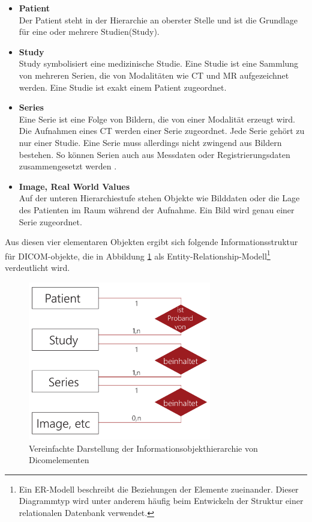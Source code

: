 \begin{itemize}
	\item \textbf{Patient}\\
	Der Patient steht in der Hierarchie an oberster Stelle und ist die Grundlage für eine oder mehrere Studien(Study).
	\item	\textbf{Study}\\
	Study symbolisiert eine medizinische Studie. Eine Studie ist eine Sammlung von mehreren Serien, die von Modalitäten wie CT und MR aufgezeichnet werden. Eine Studie ist exakt einem Patient zugeordnet.
	\item \textbf{Series}\\
	Eine Serie ist eine Folge von Bildern, die von einer Modalität erzeugt wird. Die Aufnahmen eines CT werden einer Serie zugeordnet. Jede Serie gehört zu nur einer Studie. Eine Serie muss allerdings nicht zwingend aus Bildern bestehen. So können Serien auch aus Messdaten oder Registrierungsdaten zusammengesetzt werden \cite[A.1.2]{dicom:iod}.
	\item \textbf{Image, Real World Values}\\
	Auf der unteren Hierarchiestufe stehen Objekte wie Bilddaten oder die Lage des Patienten im Raum während der Aufnahme. Ein Bild wird genau einer Serie zugeordnet.
\end{itemize}

Aus diesen vier elementaren Objekten ergibt sich folgende Informationsstruktur für DICOM-objekte, die in Abbildung \ref{ermodel} als Entity-Relationship-Modell\footnote{Ein ER-Modell beschreibt die Beziehungen der Elemente zueinander. Dieser Diagrammtyp wird unter anderem häufig beim Entwickeln der Struktur einer relationalen Datenbank verwendet.} verdeutlicht wird.

\begin{figure}[htbp]
  \vspace{0.5cm}
  \centering
  \includegraphics[angle=0,width=8cm]{./img/ermodel.pdf}
  \caption{Vereinfachte Darstellung der Informationsobjekthierarchie von Dicomelementen \cite[A.1.2]{dicom:iod}}
  \label{ermodel}
  \vspace{0.5cm}
\end{figure}


